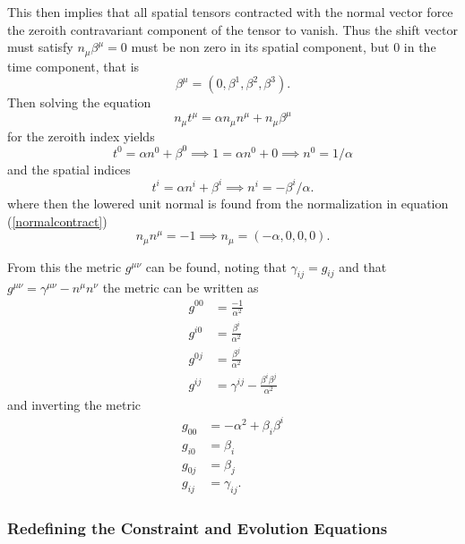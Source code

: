 \documentclass[11pt]{article}
\numberwithin{equation}{section}
\begin{document}
This then implies that all spatial tensors contracted with the normal vector force the zeroith contravariant component of the tensor to vanish. Thus the shift vector must satisfy $n_{\mu}\beta^{\mu} = 0$ must be non zero in its spatial component, but $0$ in the time component, that is
\begin{equation}
\beta^{\mu} = (0, \beta^{1}, \beta^{2}, \beta^{3}).
\end{equation}
Then solving the equation 
\begin{equation}
n_{\mu}t^{\mu} = \alpha n_{\mu}n^{\mu} + n_{\mu}\beta^{\mu}
\end{equation}
for the zeroith index yields
\begin{equation}
t^0 = \alpha n^0 + \beta^0 \implies 1 = \alpha n^{0} + 0 \implies n^{0} = 1/\alpha
\end{equation}
and the spatial indices
\begin{equation}
t^i = \alpha n^i + \beta^i \implies n^i = -\beta^i / \alpha. 
\end{equation}
where then the lowered unit normal is found from the normalization in equation (\ref{normalcontract}) 
\begin{equation}
  n_{\mu}n^{\mu} = -1 \implies n_{\mu} = (-\alpha, 0, 0, 0).
\end{equation}

From this the metric $g^{\mu\nu}$ can be found, noting that $\gamma_{ij} = g_{ij}$ and that $g^{\mu\nu} = \gamma^{\mu\nu} - n^{\mu}n^{\nu}$ the metric can be written as
\begin{align}
g^{00} &= \frac{-1}{\alpha^2} \\ 
g^{i0} &= \frac{\beta^i}{\alpha^2} \\
g^{0j} &= \frac{\beta^j}{\alpha^2} \\
g^{ij} &= \gamma^{ij} - \frac{\beta^i\beta^j}{\alpha^2}
\end{align} 
and inverting the metric
\begin{align}
g_{00} &= -\alpha^2 + \beta_i\beta^i \\ 
g_{i0} &= \beta_i \\
g_{0j} &= \beta_j \\
g_{ij} &= \gamma_{ij}.
\end{align}

\subsubsection{Redefining the Constraint and Evolution Equations}
\end{document}
